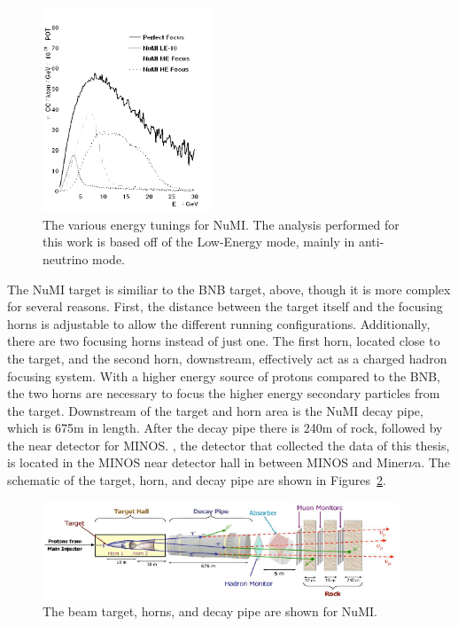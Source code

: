 \begin{figure}[htbp]
  \centering
  \includegraphics[width=0.45\textwidth]{beams_figures/numi_focus_vs_perfect.png}
  \caption[NuMI Energy Modes]{The various energy tunings for NuMI.  The analysis performed for this work is based off of the Low-Energy mode, mainly in anti-neutrino mode.}
  \label{fig:numi_spectra}
\end{figure}

The NuMI target is similiar to the BNB target, above, though it is more complex for several reasons.  First, the distance between the target itself and the focusing horns is adjustable to allow the different running configurations.  Additionally, there are two focusing horns instead of just one.  The first horn, located close to the target, and the second horn, downstream, effectively act as a charged hadron focusing system.  With a higher energy source of protons compared to the BNB, the two horns are necessary to focus the higher energy secondary particles from the target.  Downstream of the target and horn area is the NuMI decay pipe, which is 675m in length.  After the decay pipe there is 240m of rock, followed by the near detector for MINOS.  \argoneut, the detector that collected the data of this thesis, is located in the MINOS near detector hall in between MINOS and Miner{$\nu$}a.
The schematic of the target, horn, and decay pipe are shown in Figures~\ref{fig:numi_horn}.

\begin{figure}[htbp]
  \centering
  \includegraphics[width=0.95\textwidth]{beams_figures/numi_beam_target.png}
  \caption[NuMI Beam Target]{The beam target, horns, and decay pipe are shown for NuMI.}
  \label{fig:numi_horn}
\end{figure}

